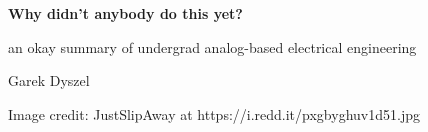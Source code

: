 \documentclass{amsart}
\begin{document}
\vspace*{\fill}

\begin{flushleft}
\Huge{\textbf{Why didn't anybody do this yet?}}
  
\LARGE{an okay summary of undergrad analog-based electrical engineering}

\vspace{0.2cm}
\Large{Garek Dyszel}
\end{flushleft}

\vspace*{\fill}

\tiny{Image credit: JustSlipAway at https://i.redd.it/pxgbyghuv1d51.jpg}
\end{document}
